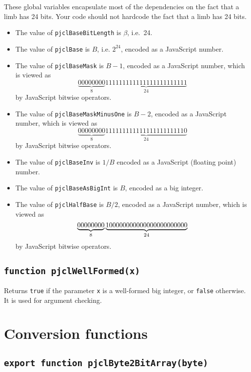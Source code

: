 \documentclass[12pt]{article}
\begin{document}
These global variables encapsulate most of the dependencies on the
fact that a limb has 24 bits.  Your code should not hardcode the fact
that a limb has 24 bits.
\begin{itemize}

\item The value of {\tt pjclBaseBitLength} is $\beta$, i.e.\ 24.

\item The value of {\tt pjclBase} is $B$, i.e. $2^{24}$, encoded as a JavaScript number.

\item The value of {\tt pjclBaseMask} is $B-1$, encoded as a JavaScript number,
which is viewed as
$$
\underbrace{00000000}_8\underbrace{111111111111111111111111}_{24}
$$
by JavaScript bitwise operators.

\item The value of {\tt pjclBaseMaskMinusOne} is $B-2$, encoded as a JavaScript number,
which is viewed as
$$
\underbrace{00000000}_8\underbrace{111111111111111111111110}_{24}
$$
by JavaScript bitwise operators.

\item The value of {\tt pjclBaseInv} is $1/B$ encoded as a JavaScript (floating point) number.

\item The value of {\tt pjclBaseAsBigInt} is $B$, encoded as a big integer.

\item The value of {\tt pjclHalfBase} is $B/2$, encoded as a JavaScript number,
which is viewed as
$$
\underbrace{00000000}_8\underbrace{100000000000000000000000\tt }_{24}
$$
by JavaScript bitwise operators.

\end{itemize}

\subsection{\tt function pjclWellFormed(x)}

Returns {\tt true} if the parameter {\tt x} is a well-formed big
integer, or {\tt false} otherwise.  It is used for argument checking.

\section{Conversion functions}

\subsection{\tt export function pjclByte2BitArray(byte)}
\end{document}
